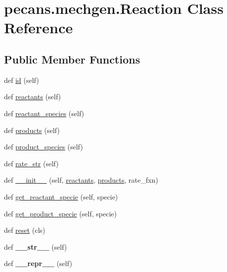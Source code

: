 \hypertarget{classpecans_1_1mechgen_1_1Reaction}{}\section{pecans.\+mechgen.\+Reaction Class Reference}
\label{classpecans_1_1mechgen_1_1Reaction}
\subsection*{Public Member Functions}
\begin{DoxyCompactItemize}
\item 
def \hyperlink{classpecans_1_1mechgen_1_1Reaction_af015fb33f81a10a78d7e6ded5cf87be3}{id} (self)
\item 
def \hyperlink{classpecans_1_1mechgen_1_1Reaction_ac34f1f9597da3db1006890ca85e6d0a1}{reactants} (self)
\item 
def \hyperlink{classpecans_1_1mechgen_1_1Reaction_a8ee6cd94ee1de2c976232a5fa48d6c49}{reactant\+\_\+species} (self)
\item 
def \hyperlink{classpecans_1_1mechgen_1_1Reaction_a9890da73e627898c56c2fe1a09390e80}{products} (self)
\item 
def \hyperlink{classpecans_1_1mechgen_1_1Reaction_a1f6e4a9ad710e9a3636477a5d27a81c4}{product\+\_\+species} (self)
\item 
def \hyperlink{classpecans_1_1mechgen_1_1Reaction_ad25ecc71077556da29052f6afec9545f}{rate\+\_\+str} (self)
\item 
def \hyperlink{classpecans_1_1mechgen_1_1Reaction_adf16a0cf2950aab7ea62aefebcd4789f}{\+\_\+\+\_\+init\+\_\+\+\_\+} (self, \hyperlink{classpecans_1_1mechgen_1_1Reaction_ac34f1f9597da3db1006890ca85e6d0a1}{reactants}, \hyperlink{classpecans_1_1mechgen_1_1Reaction_a9890da73e627898c56c2fe1a09390e80}{products}, rate\+\_\+fxn)
\item 
def \hyperlink{classpecans_1_1mechgen_1_1Reaction_a9acdeaab1e5420929c7500e11c78b41d}{get\+\_\+reactant\+\_\+specie} (self, specie)
\item 
def \hyperlink{classpecans_1_1mechgen_1_1Reaction_a92487621cd9e2227ee81b4061caf502e}{get\+\_\+product\+\_\+specie} (self, specie)
\item 
def \hyperlink{classpecans_1_1mechgen_1_1Reaction_ae1abd8da5f183602e6ec3602bc7f2f22}{reset} (cls)
\item 
def {\bfseries \+\_\+\+\_\+str\+\_\+\+\_\+} (self)\hypertarget{classpecans_1_1mechgen_1_1Reaction_a074ffdf5307e850241772dbfa2c3d17a}{}\label{classpecans_1_1mechgen_1_1Reaction_a074ffdf5307e850241772dbfa2c3d17a}

\item 
def {\bfseries \+\_\+\+\_\+repr\+\_\+\+\_\+} (self)\hypertarget{classpecans_1_1mechgen_1_1Reaction_aa51f5848ba5bc1689c603dbc1a68192d}{}\label{classpecans_1_1mechgen_1_1Reaction_aa51f5848ba5bc1689c603dbc1a68192d}

\end{DoxyCompactItemize}
